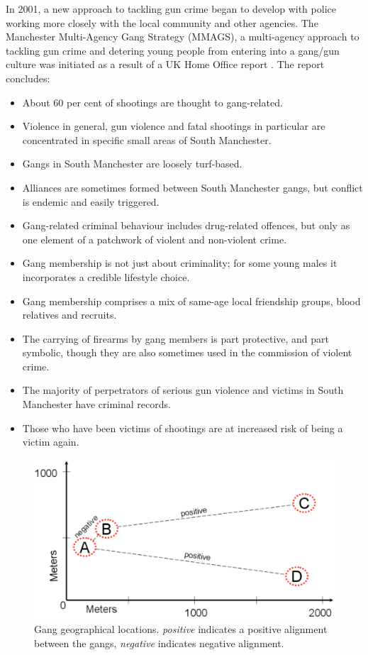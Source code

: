 \documentclass[twocolumn]{svjour3}          %
\theoremstyle{definition}
\begin{document}
In 2001, a new approach to tackling gun crime began to develop with
police working more closely with the local community and other
agencies. The Manchester Multi-Agency Gang Strategy (MMAGS), a
multi-agency approach to tackling gun crime and detering young people
from entering into a gang/gun culture was initiated as a result of a
UK Home Office report \citep{BullockTilley2002}. The report concludes:

\begin{itemize}
\item About 60 per cent of shootings are thought to gang-related.
\item Violence in general, gun violence and fatal shootings in
particular are concentrated in specific small areas of South
Manchester.
\item Gangs in South Manchester are loosely turf-based.
\item Alliances are sometimes formed between South Manchester gangs,
but conflict is endemic and easily triggered.
\item Gang-related criminal behaviour includes drug-related offences,
but only as one element of a patchwork of violent and non-violent
crime.
\item Gang membership is not just about criminality; for some young
males it incorporates a credible lifestyle choice.
\item Gang membership comprises a mix of same-age local friendship
groups, blood relatives and recruits.
\item The carrying of firearms by gang members is part protective, and
part symbolic, though they are also sometimes used in the commission
of violent crime.
\item The majority of perpetrators of serious gun violence and victims
in South Manchester have criminal records.
\item Those who have been victims of shootings are at increased risk
of being a victim again.
\end{itemize}

\begin{figure}[!ht]
\centering
\includegraphics[width=\columnwidth]{images/positive}
\caption{Gang geographical locations. \emph{positive} indicates a positive alignment between the gangs, \emph{negative} indicates negative alignment.}
\label{fig:positive} 
\end{figure}
\end{document}
